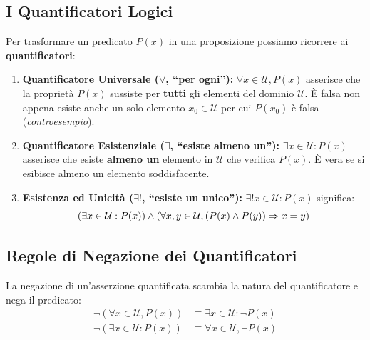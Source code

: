 \subsection{I Quantificatori Logici}
Per trasformare un predicato $P(x)$ in una proposizione possiamo ricorrere ai \textbf{quantificatori}:
\begin{enumerate}
    \item \textbf{Quantificatore Universale ($\forall$, ``per ogni''):}
    $\forall x \in \mathcal{U}, P(x)$ asserisce che la proprietà $P(x)$ sussiste per \textbf{tutti} gli elementi del dominio $\mathcal{U}$. È falsa non appena esiste anche un solo elemento $x_0 \in \mathcal{U}$ per cui $P(x_0)$ è falsa (\emph{controesempio}).
    \item \textbf{Quantificatore Esistenziale ($\exists$, ``esiste almeno un''):}
    $\exists x \in \mathcal{U} : P(x)$ asserisce che esiste \textbf{almeno un} elemento in $\mathcal{U}$ che verifica $P(x)$. È vera se si esibisce almeno un elemento soddisfacente.
    \item \textbf{Esistenza ed Unicità ($\exists!$, ``esiste un unico''):}
    $\exists! x \in \mathcal{U} : P(x)$ significa:
    \[
        (\exists x \in \mathcal{U} : P(x)) \wedge (\forall x, y \in \mathcal{U}, (P(x) \wedge P(y)) \Rightarrow x = y)
    \]
\end{enumerate}

\subsection{Regole di Negazione dei Quantificatori}
La negazione di un'asserzione quantificata scambia la natura del quantificatore e nega il predicato:
\begin{align}
    \neg (\forall x \in \mathcal{U}, P(x)) &\equiv \exists x \in \mathcal{U} : \neg P(x) \label{eq:neg_all} \\
    \neg (\exists x \in \mathcal{U} : P(x)) &\equiv \forall x \in \mathcal{U}, \neg P(x) \label{eq:neg_ex}
\end{align}

